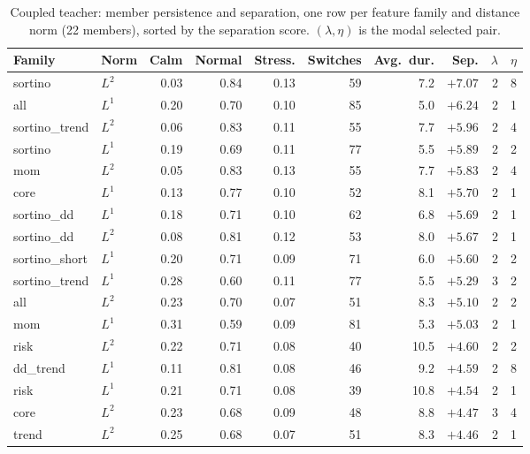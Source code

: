 \begin{table}[H]
\centering\small
\caption{Coupled teacher: member persistence and separation, one row per feature family and
distance norm (22 members), sorted by the separation score. $(\lambda,\eta)$ is the modal
selected pair.}
\label{tab:c-members}
\begin{adjustbox}{center,max width=\linewidth}
\begin{tabular}{llrrrrrrrr}
\toprule
Family & Norm & Calm & Normal & Stress. & Switches & Avg.\ dur. & Sep. & $\lambda$ & $\eta$ \\
\midrule
sortino & $L^2$ & 0.03 & 0.84 & 0.13 & 59 & \phantom{0}7.2 & $+7.07$ & 2 & 8 \\
all & $L^1$ & 0.20 & 0.70 & 0.10 & 85 & \phantom{0}5.0 & $+6.24$ & 2 & 1 \\
sortino\_trend & $L^2$ & 0.06 & 0.83 & 0.11 & 55 & \phantom{0}7.7 & $+5.96$ & 2 & 4 \\
sortino & $L^1$ & 0.19 & 0.69 & 0.11 & 77 & \phantom{0}5.5 & $+5.89$ & 2 & 2 \\
mom & $L^2$ & 0.05 & 0.83 & 0.13 & 55 & \phantom{0}7.7 & $+5.83$ & 2 & 4 \\
core & $L^1$ & 0.13 & 0.77 & 0.10 & 52 & \phantom{0}8.1 & $+5.70$ & 2 & 1 \\
sortino\_dd & $L^1$ & 0.18 & 0.71 & 0.10 & 62 & \phantom{0}6.8 & $+5.69$ & 2 & 1 \\
sortino\_dd & $L^2$ & 0.08 & 0.81 & 0.12 & 53 & \phantom{0}8.0 & $+5.67$ & 2 & 1 \\
sortino\_short & $L^1$ & 0.20 & 0.71 & 0.09 & 71 & \phantom{0}6.0 & $+5.60$ & 2 & 2 \\
sortino\_trend & $L^1$ & 0.28 & 0.60 & 0.11 & 77 & \phantom{0}5.5 & $+5.29$ & 3 & 2 \\
all & $L^2$ & 0.23 & 0.70 & 0.07 & 51 & \phantom{0}8.3 & $+5.10$ & 2 & 2 \\
mom & $L^1$ & 0.31 & 0.59 & 0.09 & 81 & \phantom{0}5.3 & $+5.03$ & 2 & 1 \\
risk & $L^2$ & 0.22 & 0.71 & 0.08 & 40 & 10.5 & $+4.60$ & 2 & 2 \\
dd\_trend & $L^1$ & 0.11 & 0.81 & 0.08 & 46 & \phantom{0}9.2 & $+4.59$ & 2 & 8 \\
risk & $L^1$ & 0.21 & 0.71 & 0.08 & 39 & 10.8 & $+4.54$ & 2 & 1 \\
core & $L^2$ & 0.23 & 0.68 & 0.09 & 48 & \phantom{0}8.8 & $+4.47$ & 3 & 4 \\
trend & $L^2$ & 0.25 & 0.68 & 0.07 & 51 & \phantom{0}8.3 & $+4.46$ & 2 & 1 \\

\end{tabular}
\end{adjustbox}
\end{table}
